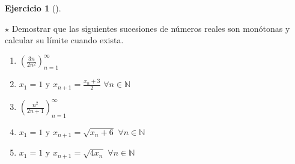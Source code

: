\documentclass[
  spanish,
  a4paper,
]{scrreport}
\theoremstyle{definition}
\newtheorem{exercise}{Ejercicio}[chapter]
\theoremstyle{remark}
\begin{document}
\begin{exercise}[]\protect\hypertarget{exr-sucesiones-monotonas}{}\label{exr-sucesiones-monotonas}

\(\star\) Demostrar que las siguientes sucesiones de números reales son
monótonas y calcular su límite cuando exista.

\begin{enumerate}
\def\labelenumi{\alph{enumi}.}
\item
  \(\left(\frac{3n}{2n^2}\right)_{n=1}^\infty\)
\item
  \(x_1=1\) y \(x_{n+1}=\frac{x_n+3}{2}\) \(\forall n \in \mathbb{N}\)
\item
  \(\left(\frac{n^2}{2n+1}\right)_{n=1}^\infty\)
\item
  \(x_1=1\) y \(x_{n+1}=\sqrt{x_n+6}\) \(\forall n\in \mathbb{N}\)
\item
  \(x_1=1\) y \(x_{n+1}=\sqrt{4x_n}\) \(\forall n\in\mathbb{N}\)
\end{enumerate}

\end{exercise}
\end{document}
